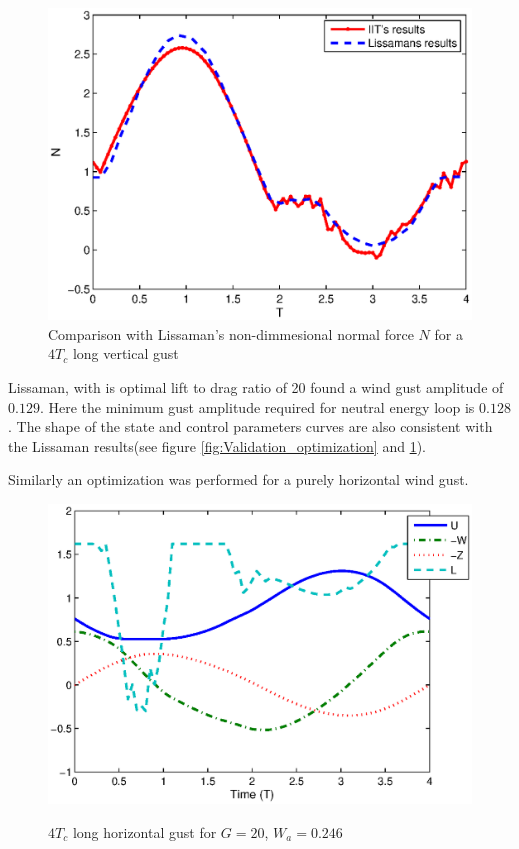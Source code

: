 \begin{figure}[h]
  \centering
  \includegraphics{./Figures/LIssaman_N_comparison.eps}
  \caption{Comparison with Lissaman's \cite{Lissaman2007neutral} non-dimmesional normal force $N$ for a $4T_c$ long vertical gust}
  \label{fig:lissaman_N_comparison}
\end{figure}


\FloatBarrier

Lissaman, with is optimal lift to drag ratio of 20 found a wind gust amplitude of $0.129$. 
Here the minimum gust amplitude required for neutral energy loop is $0.128$ .
The shape of the state and control parameters curves are also consistent with the Lissaman results(see figure \ref{fig:Validation_optimization} and \ref{fig:lissaman_N_comparison}).

\par Similarly an optimization was performed for a purely horizontal wind gust.

\begin{figure}[h]
  \begin{center}
    \scalebox{1.0}
    {\includegraphics{./Figures/Windtype=2_Tg=4_Wg=0p246_quad_G=20.eps}}
  \end{center}
  \caption{$4T_c$ long horizontal gust for $G=20$, $W_a=0.246$}
  \label{fig:Horizontal_optimization}
\end{figure}

